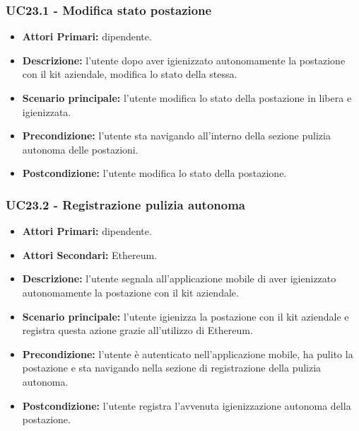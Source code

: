 \subsubsection{ UC23.1 - Modifica stato postazione }
\begin{itemize}
	\item\textbf{Attori Primari:} dipendente.
	\item\textbf{Descrizione:} l’utente dopo aver igienizzato autonomamente la postazione con il kit aziendale, modifica lo stato della stessa.
	\item\textbf{Scenario principale:} l’utente modifica lo stato della postazione in libera e igienizzata.
	\item\textbf{Precondizione:} l’utente sta navigando all'interno della sezione pulizia autonoma delle postazioni.
	\item\textbf{Postcondizione:} l’utente modifica lo stato della postazione.
\end{itemize}

\subsubsection{ UC23.2 - Registrazione pulizia autonoma }
\begin{itemize}
	\item\textbf{Attori Primari:} dipendente.
	\item\textbf{Attori Secondari:} Ethereum.
	\item\textbf{Descrizione:} l’utente segnala all'applicazione mobile di aver igienizzato autonomamente la postazione con il kit aziendale.
	\item\textbf{Scenario principale:} l’utente igienizza la postazione con il kit aziendale e registra questa azione grazie all'utilizzo di Ethereum.
	\item\textbf{Precondizione:} l’utente è autenticato nell'applicazione mobile, ha pulito la postazione e sta navigando nella sezione di 
	registrazione della pulizia autonoma.
	\item\textbf{Postcondizione:} l’utente registra l'avvenuta igienizzazione autonoma della postazione.
\end{itemize}
